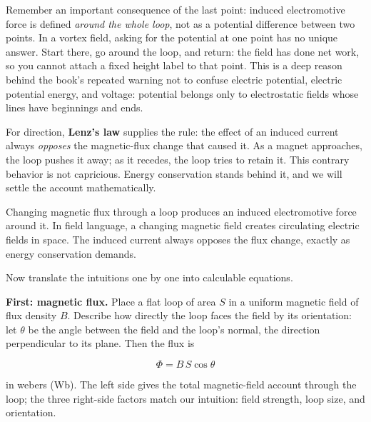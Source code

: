 Remember an important consequence of the last point: induced electromotive force is defined \emph{around the whole loop}, not as a potential difference between two points. In a vortex field, asking for the potential at one point has no unique answer. Start there, go around the loop, and return: the field has done net work, so you cannot attach a fixed height label to that point. This is a deep reason behind the book's repeated warning not to confuse electric potential, electric potential energy, and voltage: potential belongs only to electrostatic fields whose lines have beginnings and ends.

For direction, \textbf{Lenz's law} supplies the rule: the effect of an induced current always \emph{opposes} the magnetic-flux change that caused it. As a magnet approaches, the loop pushes it away; as it recedes, the loop tries to retain it. This contrary behavior is not capricious. Energy conservation stands behind it, and we will settle the account mathematically.


\begin{oneline}
Changing magnetic flux through a loop produces an induced electromotive force around it. In field language, a changing magnetic field creates circulating electric fields in space. The induced current always opposes the flux change, exactly as energy conservation demands.
\end{oneline}


Now translate the intuitions one by one into calculable equations.

\textbf{First: magnetic flux.} Place a flat loop of area \(S\) in a uniform magnetic field of flux density \(B\). Describe how directly the loop faces the field by its orientation: let \(\theta\) be the angle between the field and the loop's normal, the direction perpendicular to its plane. Then the flux is

\[
\Phi = B\,S\cos\theta
\]

in webers (Wb). The left side gives the total magnetic-field account through the loop; the three right-side factors match our intuition: field strength, loop size, and orientation.

\begin{center}
\end{center}

